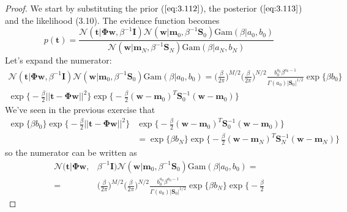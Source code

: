 \vspace{1em}
\begin{proof}
    We start by substituting the prior ($\ref{eq:3.112}$), the
    posterior $(\ref{eq:3.113}$) and the likelihood (3.10). The
    evidence function becomes
    \[
        p(\mathbf{t}) = \frac{
            \mathcal{N}(\mathbf{t} | \mathbf{\Phi}\mathbf{w}, \beta^{-1}\mathbf{I})
            \mathcal{N}(\mathbf{w} | \mathbf{m}_0, \beta^{-1}\mathbf{S}_0)
            \text{Gam}(\beta | a_0, b_0)}{
            \mathcal{N}(\mathbf{w} | \mathbf{m}_N, \beta^{-1}\mathbf{S}_N)
        \text{Gam}(\beta | a_N, b_N)}
    \] 
    Let's expand the numerator:
    \begin{align*}
        \mathcal{N}(\mathbf{t} | \mathbf{\Phi}\mathbf{w}, \beta^{-1}\mathbf{I})
        \mathcal{N}(\mathbf{w} | \mathbf{m}_0, \beta^{-1}\mathbf{S}_0)
        \text{Gam}(\beta | a_0, b_0) 
        = \bigg(\frac{\beta}{2\pi}\bigg)^{M/2} 
        \bigg(\frac{\beta}{2\pi}\bigg)^{N/2} 
        \frac{b_0^{a_0}\beta^{a_0 - 1}}{\Gamma(a_0)|\mathbf{S}_0|^{1/2}}
        \exp\{\beta b_0\} \\
        \exp\bigg\{-\frac{\beta}{2} ||\mathbf{t} - \mathbf{\Phi}\mathbf{w}||^2\bigg\}
        \exp\bigg\{-\frac{\beta}{2} (\mathbf{w} - \mathbf{m}_0)^T\mathbf{S}_0^{-1}
                (\mathbf{w} - \mathbf{m}_0)\bigg\}
    \end{align*}
    We've seen in the previous exercise that
    \begin{align*}
        \exp\{\beta b_0\}
         \exp\bigg\{-\frac{\beta}{2} ||\mathbf{t} - \mathbf{\Phi}\mathbf{w}||^2\bigg\}
         &\exp\bigg\{-\frac{\beta}{2}(\mathbf{w} - \mathbf{m}_0)^T
             \mathbf{S}_0^{-1}(\mathbf{w} - \mathbf{m}_0)
         \bigg\} \\
         &= \exp\{\beta b_N\}\exp\bigg\{-\frac{\beta}{2} 
            (\mathbf{w} - \mathbf{m}_N)^T\mathbf{S}_N^{-1}(\mathbf{w} - \mathbf{m}_N)\bigg\}
    \end{align*}
    so the numerator can be written as
    \begin{align*}
        \mathcal{N}(\mathbf{t} | \mathbf{\Phi}\mathbf{w},& \beta^{-1}\mathbf{I})
            \mathcal{N}(\mathbf{w} | \mathbf{m}_0, \beta^{-1}\mathbf{S}_0)
            \text{Gam}(\beta | a_0, b_0) = \\
        =& \bigg(\frac{\beta}{2\pi}\bigg)^{M/2} 
            \bigg(\frac{\beta}{2\pi}\bigg)^{N/2} 
            \frac{b_0^{a_0}\beta^{a_0 - 1}}{\Gamma(a_0)|\mathbf{S}_0|^{1/2}}
            \exp\{\beta b_N\}\exp\bigg\{-\frac{\beta}{2} 

\end{align*}
\end{proof}
